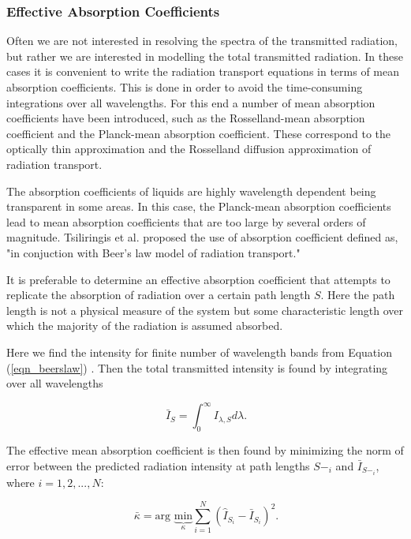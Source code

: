 \subsubsection{Effective Absorption Coefficients}

Often we are not interested in resolving the spectra of the transmitted radiation, but rather we are interested in modelling the total transmitted radiation.  In these cases it is convenient to write the radiation transport equations in terms of mean absorption coefficients. This is done in order to avoid the time-consuming integrations over all wavelengths. For this end a number of mean absorption coefficients have been introduced, such as the Rosselland-mean absorption coefficient and the Planck-mean absorption coefficient. These correspond to the optically thin approximation and the Rosselland diffusion approximation of radiation transport.

The absorption coefficients of liquids are highly wavelength dependent being transparent in some areas. In this case, the Planck-mean absorption coefficients lead to mean absorption coefficients that are too large by several orders of magnitude. Tsiliringis et al. \cite{Tsilingiris:ECM2003} proposed the use of absorption coefficient defined as, "in conjuction with Beer's law model of radiation transport."

It is preferable to determine an effective absorption coefficient that attempts to replicate the absorption of radiation over a certain path length $S$. Here the path length is not a physical measure of the system but some characteristic length over which the majority of the radiation is assumed absorbed.

Here we find the intensity for finite number of wavelength bands from Equation (\ref{eqn_beerslaw}) . Then the total transmitted intensity is found by integrating over all wavelengths

\begin{equation}
\label{eqn_totintens}
     \ \bar{I}_S = \int_{0}^{\infty} I_{\lambda,S} d\lambda \mbox{.}
\end{equation}

The effective mean absorption coefficient is then found by minimizing the norm of error between the predicted radiation intensity at path lengths $S-_i$ and $\bar{I}_{S-_i}$, where $i=1,2,...,N$:

\begin{equation}
\label{eqn_effcoeff}
     \ \bar{\kappa} = \mbox{arg } \underbrace{\mbox{min}}_{\kappa} \sum_{i=1}^{N} \left(\hat{I}_{S_i}-\bar{I}_{S_i}\right)^{2}  \mbox{.}
\end{equation}

